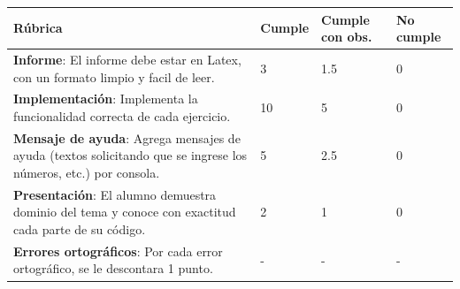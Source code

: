 \documentclass{article}
\begin{document}
	\begin{table}[hbt!]
		\setlength{\tabcolsep}{0.5em} %
		{\renewcommand{\arraystretch}{1.5}%
		\begin{tabular}{|p{5cm}|x{3cm}|x{3cm}|x{3cm}|}
			\hline 
			\textbf{Rúbrica} & \textbf{Cumple}  & \textbf{Cumple con obs.}  & \textbf{No cumple} \\
			\hline 
			\textbf{Informe}: El informe debe estar en Latex, con un formato limpio y facil de leer.  & 3 & 1.5 & 0   \\ 
			\hline 
			\textbf{Implementación}: Implementa la funcionalidad correcta de cada ejercicio.  & 10 & 5 & 0   \\ \hline
			\textbf{Mensaje de ayuda}: Agrega mensajes de ayuda (textos solicitando que se ingrese los números, etc.) por consola.  & 5 & 2.5 & 0   \\ \hline
			
							
			\textbf{Presentación}: El alumno demuestra dominio del tema y conoce con exactitud cada parte de su código. & 2 & 1 & 0   \\ 			\hline 
			
			\textbf{Errores ortográficos}: Por cada error ortográfico, se le descontara 1 punto.  & - & - & -   \\ \hline
			
		\end{tabular}
	}
	\end{table}
	
	
	
	
	
	
	
\end{document}
